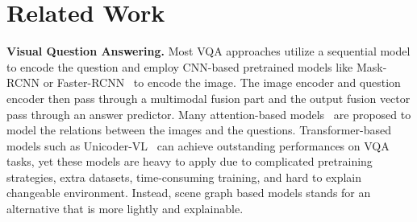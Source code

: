 \documentclass[letterpaper]{article} %
\begin{document}
\section{Related Work}
\noindent\textbf{Visual Question Answering.}
Most VQA approaches utilize a sequential model to encode the question and employ CNN-based pretrained models like Mask-RCNN or Faster-RCNN~\cite{DBLP:conf/cvpr/PatroN18,DBLP:conf/cvpr/NamHK17} to encode the image.
The image encoder and question encoder then pass through a multimodal fusion part and the output fusion vector pass through an answer predictor.
Many attention-based models~\cite{DBLP:conf/cvpr/00010BT0GZ18,DBLP:conf/cvpr/FanZ18,DBLP:conf/eccv/XuS16,DBLP:conf/nips/LuYBP16,DBLP:conf/iclr/HudsonM18} are proposed to model the relations between the images and the questions.
Transformer-based models such as Unicoder-VL~\cite{DBLP:conf/aaai/LiDFGJ20} can achieve outstanding performances on VQA tasks, yet these models are heavy to apply due to complicated pretraining strategies, extra datasets, time-consuming training, and hard to explain changeable environment. 
Instead, scene graph based models stands for an alternative that is more lightly and explainable.
\end{document}
